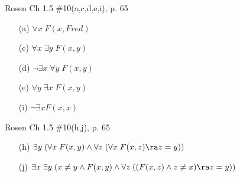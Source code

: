 \begin{questions}
 Rosen Ch 1.5 \#10(a,c,d,e,i), p. 65
    \ifprintanswers
        \vspace{-12pt}
    \fi
  \begin{solution}
      \begin{itemize}[itemsep=0pt,parsep=0pt,topsep=0pt,partopsep=0pt]
         \item[(a)] $\forall x\; F(x,Fred)$
          \item[(c)] $\forall x\; \exists y\; F(x,y)$
         \item[(d)] $\neg \exists x\; \forall y\; F(x,y)$
         \item[(e)] $ \forall y\; \exists x\; F(x,y)$
         \item[(i)] $\neg \exists x F(x,x)$
      \end{itemize}
  \end{solution}


\bonusquestion[4] Rosen Ch 1.5 \#10(h,j), p. 65
    \ifprintanswers
        \vspace{-12pt}
    \fi
  \begin{solution}
      \begin{itemize}[itemsep=0pt,parsep=0pt,topsep=0pt,partopsep=0pt]
         \item[(h)] $\exists y\; (\forall x\; F(x,y) \wedge \forall z\; (\forall x\; F(x,z) \ra z = y))$
         \item[(j)] $\exists x\; \exists y\; (x \neq y \wedge F(x,y) \wedge \forall z\; ((F(x,z) \wedge z \neq x) \ra z = y))$
      \end{itemize}
  \end{solution}



\end{questions}
